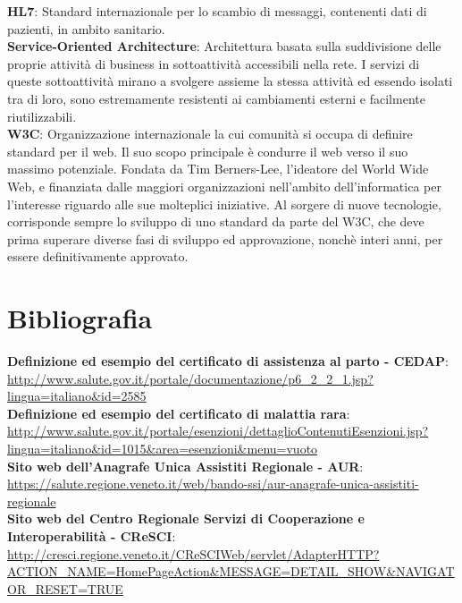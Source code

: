 \documentclass[a4paper]{article}
\begin{document}
\noindent
\textbf{HL7}: Standard internazionale per lo scambio di messaggi, contenenti dati di pazienti, in ambito sanitario.
\\

\noindent
\textbf{Service-Oriented Architecture}: Architettura basata sulla suddivisione delle proprie attività di business in sottoattività accessibili nella rete. I servizi di queste sottoattività mirano a svolgere assieme la stessa attività ed essendo isolati tra di loro, sono estremamente resistenti ai cambiamenti esterni e facilmente riutilizzabili.
\\

\noindent
\textbf{W3C}: Organizzazione internazionale la cui comunità si occupa di definire standard per il web. Il suo scopo principale è condurre il web verso il suo massimo potenziale. Fondata da Tim Berners-Lee, l'ideatore del World Wide Web, e finanziata dalle maggiori organizzazioni nell'ambito dell'informatica per l'interesse riguardo alle sue molteplici iniziative. Al sorgere di nuove tecnologie, corrisponde sempre lo sviluppo di uno standard da parte del W3C, che deve prima superare diverse fasi di sviluppo ed approvazione, nonchè interi anni, per essere definitivamente approvato.
\\

\newpage

\section{Bibliografia}

\textbf{Definizione ed esempio del certificato di assistenza al parto - CEDAP}: \url{http://www.salute.gov.it/portale/documentazione/p6_2_2_1.jsp?lingua=italiano&id=2585}
\\

\noindent
\textbf{Definizione ed esempio del certificato di malattia rara}: \url{http://www.salute.gov.it/portale/esenzioni/dettaglioContenutiEsenzioni.jsp?lingua=italiano&id=1015&area=esenzioni&menu=vuoto}
\\

\noindent
\textbf{Sito web dell'Anagrafe Unica Assistiti Regionale - AUR}: \url{https://salute.regione.veneto.it/web/bando-ssi/aur-anagrafe-unica-assistiti-regionale}
\\

\noindent
\textbf{Sito web del Centro Regionale Servizi di Cooperazione e Interoperabilità - CReSCI}: \url{http://cresci.regione.veneto.it/CReSCIWeb/servlet/AdapterHTTP?ACTION_NAME=HomePageAction&MESSAGE=DETAIL_SHOW&NAVIGATOR_RESET=TRUE}
\\
\end{document}

